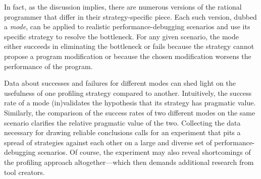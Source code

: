 In fact, as the discussion implies, there are numerous versions of the rational
programmer that differ in their strategy-specific piece. Each such version,
dubbed a \emph{mode}, can be applied to realistic performance-debugging
scenarios and use its specific strategy to resolve the bottleneck.  For any
given scenario, the mode either succeeds in eliminating the bottleneck or fails
because the strategy cannot propose a program modification or because the chosen
modification worsens the performance of the program. 

Data about successes and failures for different modes can shed light on the
usefulness of one profiling strategy compared to another. Intuitively, the
success rate of a mode (in)validates the hypothesis that its strategy has
pragmatic value. Similarly, the comparison of the success rates of two different
modes on the same scenario clarifies the relative pragmatic value of the
two. Collecting the data necessary for drawing reliable conclusions calls for an
experiment that pits a spread of strategies against each other on a large and
diverse set of performance-debugging scenarios. Of course, the experiment may
also reveal shortcomings of the profiling approach altogether---which then
demands additional research from tool creators. 
